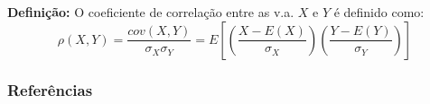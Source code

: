 \documentclass[14pt,aspectratio=1610]{beamer}
\begin{document}
\begin{frame}{}
\frametitle{}
\begin{block}{}
\justifying
\textbf{Definição:} O coeficiente de correlação entre as v.a. $X$ e $Y$ é definido como: 
$$\rho(X,Y)=\dfrac{cov(X,Y)}{\sigma_{X}\sigma_{Y}}=E\left[\left(\dfrac{X-E(X)}{\sigma_{X}}\right)\left(\dfrac{Y-E(Y)}{\sigma_{Y}}\right)\right]$$
\end{block}
\nocite{roteiro}
\nocite{Morettin09, Apostila, eric, montgomery2016, meyer1982probabilidade, Bastos2025}
\end{frame}

\begin{frame}[allowframebreaks]
\frametitle{\bf Referências}
\printbibliography
\end{frame}
\end{document}
